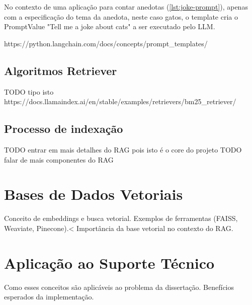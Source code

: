 No contexto de uma aplicação para contar anedotas (\ref{lst:joke-prompt}), apenas com a especificação do tema da anedota, neste caso gatos, o template cria o PromptValue "Tell me a joke about cats"  a ser executado pelo LLM.


https://python.langchain.com/docs/concepts/prompt\_templates/


\subsection{Algoritmos Retriever}

TODO tipo isto https://docs.llamaindex.ai/en/stable/examples/retrievers/bm25_retriever/



\subsection{Processo de indexação}

TODO entrar em mais detalhes do RAG pois isto é o core do projeto
TODO falar de mais componentes do RAG


\section{Bases de Dados Vetoriais}

Conceito de embeddings e busca vetorial.
Exemplos de ferramentas (FAISS, Weaviate, Pinecone).<
Importância da base vetorial no contexto do RAG.

\section{Aplicação ao Suporte Técnico}

Como esses conceitos são aplicáveis ao problema da dissertação.
Benefícios esperados da implementação.
